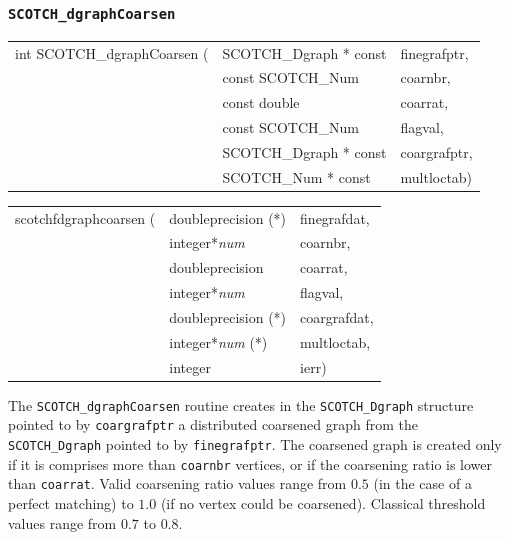 \subsubsection{{\tt SCOTCH\_dgraphCoarsen}}
\label{sec-lib-func-dgraphcoarsen}

\begin{itemize}
\progsyn

{\tt\begin{tabular}{l@{}ll}
int SCOTCH\_dgraphCoarsen ( & SCOTCH\_Dgraph * const & finegrafptr, \\
                            & const SCOTCH\_Num      & coarnbr,     \\
                            & const double           & coarrat,     \\
                            & const SCOTCH\_Num      & flagval,     \\
                            & SCOTCH\_Dgraph * const & coargrafptr, \\
                            & SCOTCH\_Num * const    & multloctab)  \\
\end{tabular}}

{\tt\begin{tabular}{l@{}ll}
scotchfdgraphcoarsen ( & doubleprecision (*)   & finegrafdat, \\
                       & integer*{\it num}     & coarnbr,     \\
                       & doubleprecision       & coarrat,     \\
                       & integer*{\it num}     & flagval,     \\
                       & doubleprecision (*)   & coargrafdat, \\
                       & integer*{\it num} (*) & multloctab,  \\
                       & integer               & ierr)
\end{tabular}}

\progdes

The {\tt SCOTCH\_dgraphCoarsen} routine creates in the
{\tt SCOTCH\_\lbt Dgraph} structure pointed to by {\tt coargrafptr}
a distributed coarsened graph from the {\tt SCOTCH\_\lbt Dgraph}
pointed to by {\tt finegrafptr}. The coarsened graph is created only
if it is comprises more than {\tt coarnbr} vertices, or if the
coarsening ratio is lower than {\tt coarrat}. Valid coarsening ratio
values range from $0.5$ (in the case of a perfect matching) to $1.0$
(if no vertex could be coarsened). Classical threshold values range
from $0.7$ to $0.8$.


\end{itemize}

